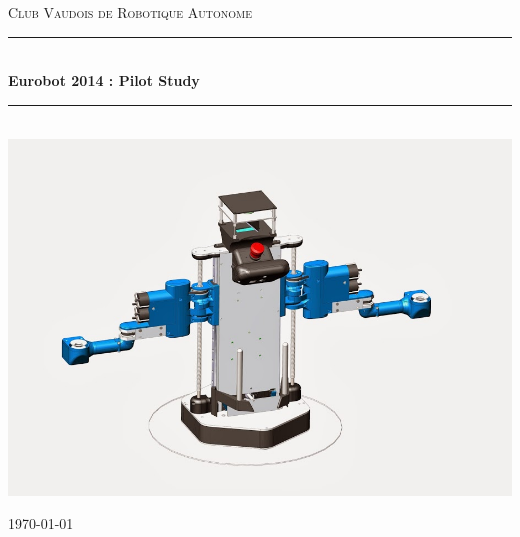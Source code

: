 \begin{titlepage}

\newcommand{\HRule}{\rule{\linewidth}{0.5mm}} %

\center %
\textsc{\LARGE Club Vaudois de Robotique Autonome}\\[1.5cm] 

\HRule \\[0.4cm]
{ \huge \bfseries Eurobot 2014 : Pilot Study}\\[0.4cm] %
\HRule \\[1.5cm]
 
\includegraphics[width=\textwidth]{images/Debra_IV_1}\\[2cm] 


\vfill %

{\large \today}
\end{titlepage}


